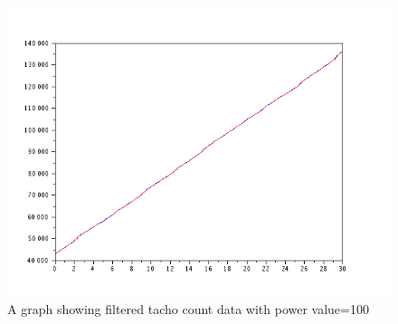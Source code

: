 \begin{figure}
\includegraphics[scale=0.5]{images/100_dat_orig+filtered.png}
\caption{A graph showing filtered tacho count data with power value=100}
\end{figure}





